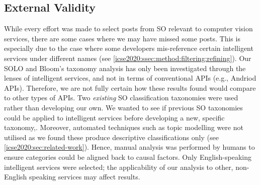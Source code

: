 \subsection{External Validity} While every effort was made to select posts from SO relevant to computer vision services, there are some cases where we may have missed some posts. This is especially due to the case where some developers mis-reference certain intelligent services under different names (see \cref{icse2020:ssec:method:filtering:refining}). 
Our SOLO and Bloom's taxonomy analysis has only been investigated through the lenses of intelligent services, and not in terms of conventional APIs (e.g., Andriod APIs). Therefore, we are not fully certain how these results found would compare to other types of APIs. %
Two \textit{existing} SO classification taxonomies were used rather than developing our own. We wanted to see if previous SO taxonomies could be applied to intelligent services before developing a new, specific taxonomy,. Moreover, automated techniques such as topic modelling were not utilised as we found these produce descriptive classifications only (see \cref{icse2020:sec:related-work}). Hence, manual analysis was performed by humans to ensure categories could be aligned back to causal factors.
Only English-speaking intelligent services were selected; the applicability of our analysis to other, non-English speaking services may affect results.

